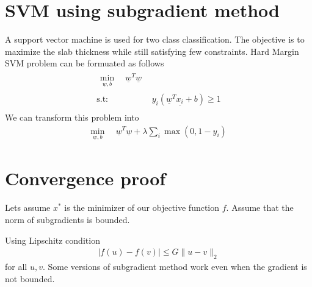 \documentclass[twoside,twocolumn]{article}
\renewcommand{\vec}[1]{\underline{#1}}
\newcommand\twospace{\,\,}
\newcommand\norm[1]{\ensuremath{\lVert#1\rVert_2}}
\begin{document}
\section{SVM using subgradient method}
A support vector machine is used for two class classification. The objective is to maximize the slab thickness while still satisfying  few constraints. Hard Margin SVM problem can be formuated as follows
\begin{align}
    \begin{split}
        \min_{\vec{w},b}\, &\twospace\vec{w}^T\vec{w}
    \end{split}\\ 
    \text{s.t:}
    \twospace & y_i(\vec{w}^T\vec{x_i}+b)\geq 1\\
\end{align}
We can transform this problem into
\begin{align}
    \min_{\vec{w},b}\, &\twospace\vec{w}^T\vec{w} + \lambda \sum_i \max(0, 1-y_i)
\end{align}

\section{Convergence proof}
Lets assume $x^*$ is the minimizer of our objective function $f$. Assume that the norm of subgradients is bounded.

Using Lipschitz condition
\begin{align}
    \left| f(u)-f(v)\right| \leq G\norm{u-v}
\end{align}
for all $u,v$. Some versions of subgradient method work even when the gradient is not bounded. 









% 
% 
\end{document}
